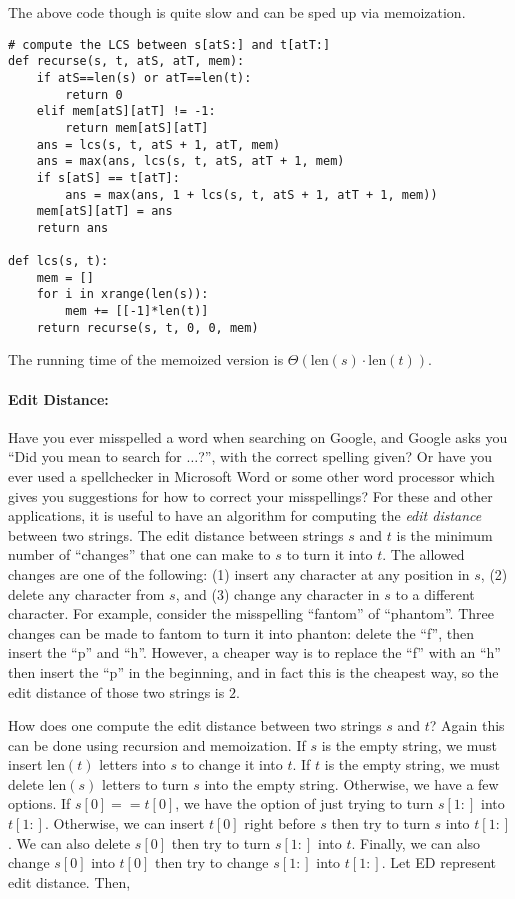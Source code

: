 \documentclass[11pt]{article}
\begin{document}
The above code though is quite slow and can be sped up via
memoization.

\begin{verbatim}
# compute the LCS between s[atS:] and t[atT:]
def recurse(s, t, atS, atT, mem):
    if atS==len(s) or atT==len(t):
        return 0
    elif mem[atS][atT] != -1:
        return mem[atS][atT]
    ans = lcs(s, t, atS + 1, atT, mem)
    ans = max(ans, lcs(s, t, atS, atT + 1, mem)
    if s[atS] == t[atT]:
        ans = max(ans, 1 + lcs(s, t, atS + 1, atT + 1, mem))
    mem[atS][atT] = ans
    return ans

def lcs(s, t):
    mem = []
    for i in xrange(len(s)):
        mem += [[-1]*len(t)]
    return recurse(s, t, 0, 0, mem)
\end{verbatim}

The running time of the memoized version is $\Theta(\mathrm{len}(s)
\cdot \mathrm{len}(t))$.

\paragraph{Edit Distance:}
Have you ever misspelled a word when searching on Google, and Google
asks you ``Did you mean to search for $\ldots$?'', with the correct
spelling given?  Or have you ever used a spellchecker in Microsoft
Word or some other word processor which gives you suggestions for how
to correct your misspellings?  For these and other applications, it is
useful to have an algorithm for computing the {\em edit distance}
between two strings.  The edit distance between strings $s$ and $t$ is
the minimum number of ``changes'' that one can make to $s$ to turn it
into $t$.  The allowed changes are one of the following: (1) insert
any character at any position in $s$, (2) delete any character from
$s$, and (3) change any character in $s$ to a different character.
For example, consider the misspelling ``fantom'' of ``phantom''.  Three
changes can be made to fantom to turn it into phanton: delete the
``f'', then insert the ``p'' and ``h''.  However, a cheaper way is to
replace the ``f'' with an ``h'' then insert the ``p'' in the
beginning, and in fact this is the cheapest way, so the edit distance
of those two strings is $2$.

How does one compute the edit distance between two strings $s$ and
$t$?  Again this can be done using recursion and memoization.  If $s$
is the empty string, we must insert $\mathrm{len}(t)$ letters into $s$ to
change it into $t$.  If $t$ is the empty string, we must delete
$\mathrm{len}(s)$ letters to turn $s$ into the empty string.
Otherwise, we have a few options.  If $s[0] == t[0]$, we have the
option of just trying to turn $s[1:]$ into $t[1:]$.  Otherwise, we can
insert $t[0]$ right before $s$ then try to turn $s$ into $t[1:]$.  We
can also delete $s[0]$ then try to turn $s[1:]$ into $t$.  Finally, we
can also change $s[0]$ into $t[0]$ then try to change $s[1:]$ into
$t[1:]$.  Let ED represent edit distance.  Then,
\end{document}
